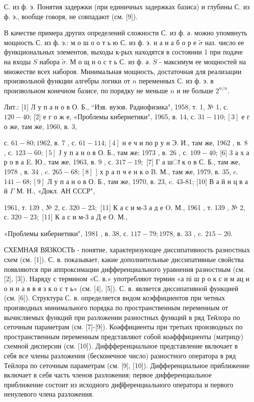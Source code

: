 \documentclass[10pt]{article}
\begin{document}
С. из ф. э. Понятия задержки (при единичных задержках базиса) и глубины С. из ф. э., вообще говоря, не совпадают (см. [9]).



В качестве примера других определений сложности С. из ф. ә. можно упомянуть мощность С. из ф. э.: м о ш о о т ь ю С. из ф. э. н а н а б о р е $\tilde{\sigma}$ наз. число ее функциональных элементов, выходы к-рых находятся в состоянии 1 при подаче на входы $S$ набора $\tilde{\sigma}$. М о щ н о с т ь С. из ф. ә. $S$ - максимум ее мощностей на множестве всех наборов. Минимальная мощность, достаточная для реализации произвольной функции алгебры логики от $n$ переменных С. из ф. э. в произвольном конечном базисе, по порядку не меньше $n$ и не больше $2^{n / n}$.



Лит.: [1] Л у п а н о в О. Б., “Изв. вузов. Радиофизика", 1958, т. 1, № 1, с. $120-40$; [2] е г о ж е, «Проблемы кибернетики", 1965, в. 14, с. $31-110 ;[3]$ е г о же, там же, 1960, в. 3,

с. $61-80 ; 1962$, в. 7 , с. $61-114 ;[4]$ н е ч и по р у н Э. И., там же, 1962 , в. 8 , с. $123-60 ;[5]$ Ј у п а н о в О. Б., там же; 1973 , в. 26 , с. $109-40$; [6] 3 а х а р о в а E. Ю., там же, 1963, в. 9 , с. $317-19 ;$ [7] Г а шा к о в С. Б., там же, 1978 , в. 34 , c. $265-68 ;[8]$ ] х р а п ч е н к о B. М., там же, 1979, в. 35, c. $141-68 ;[9]$ Л у п а н о в О. Б., там же, 1970, в. 23, c. 43-81; [10] В а й н ц в а й $\Gamma$ М. Н., «Докл. АН СССР",

1961, т. 139 , № 2, с. $320-23 ;$ [11] К а с и м-3 а д е O. М., 1961 , т. 139 , № 2, с. $320-23 ;$ [11] К а с и м-3 а Д е О. М.,

«Проблемы кибернетики", 1981 , в. 38, с. $117-79 ; 1978$, в. 33 , c. $215-20$.



СХЕМНАЯ ВЯЗКОСТЬ - понятие, характеризующее диссипативность разностных схем (см. [1]). С. в. показывает, какие дополнительные диссипативные свойства появляются при аппроксимации дифференциального уравнения разностным (см. [2], [3]). Наряду с термином «С. в.» употребляют термин «а пі ш р о к с и м ац и о н н а я в я з к о с т ь» (см. [4], [5]). С. в. является диссипативной функцией (см. [6]). Структура С. в. определяется видом коэффициентов при четных производных минимального порядка по пространственным переменным от вычисляемых функций при разложении разностных функций в ряд Тейлора по сеточным параметрам (см. [7]-[9]). Коәффициенты при третьих производных по пространственным переменным представляют собой коәфффициенты (матрицу) схемной дисперсии (см. [10]). Диффференциальное представление включает в себя все члены разложения (бесконечное число) разностного оператора в ряд Тейлора по сеточным параметрам (см. [9], [10]). Дифференциальное приближение включает в себя часть членов разложения; первое дифференциальное приближение состоит из исходного диф̆ференциального оператора и первого ненулевого члена разложения.
\end{document}
